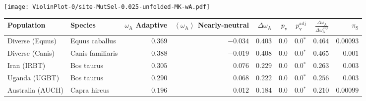 \begin{center}
\texttt{[image: ViolinPlot-0/site-MutSel-0.025-unfolded-MK-wA.pdf]} 
\begin{adjustbox}{width = 1\textwidth}
\begin{tabular}{|l|l|r|r|r|r|r|r|r|}
\toprule
                     Population &              Species & \specialcell{$\omega_{\mathrm{A}}$ \\ Adaptive} & \specialcell{$\left< \omega_{\mathrm{A}} \right>$ \\ Nearly-neutral} & $\Delta \omega_{\mathrm{A}} $ & $p_{\mathrm{v}}$ & $p_{\mathrm{v}}^{\mathrm{adj}}$ & $\frac{\Delta\omega_{\mathrm{A}}}{\Delta\omega_{\mathrm{A}}^{\mathrm{phy}}}$ & $\pi_{\textrm{S}}$ \\
\midrule
                Diverse (Equus) &       Equus caballus &                                        $ 0.369$ &                                           $-0.034$ &                      $ 0.403$ &            $0.0$ &                  $\bm{0.0{^*}}$ &                                           $ 0.464$ &          $0.00093$ \\
                Diverse (Canis) &     Canis familiaris &                                        $ 0.388$ &                                           $-0.019$ &                      $ 0.408$ &            $0.0$ &                  $\bm{0.0{^*}}$ &                                           $ 0.465$ &           $ 0.001$ \\
                    Iran (IRBT) &           Bos taurus &                                        $ 0.305$ &                                           $ 0.076$ &                      $ 0.229$ &            $0.0$ &                  $\bm{0.0{^*}}$ &                                           $ 0.263$ &           $ 0.003$ \\
                  Uganda (UGBT) &           Bos taurus &                                        $ 0.290$ &                                           $ 0.068$ &                      $ 0.222$ &            $0.0$ &                  $\bm{0.0{^*}}$ &                                           $ 0.256$ &           $ 0.003$ \\
               Australia (AUCH) &         Capra hircus &                                        $ 0.196$ &                                           $ 0.012$ &                      $ 0.184$ &            $0.0$ &                  $\bm{0.0{^*}}$ &                                           $ 0.210$ &          $0.00099$ \\

\end{tabular}
\end{adjustbox}
\end{center}
